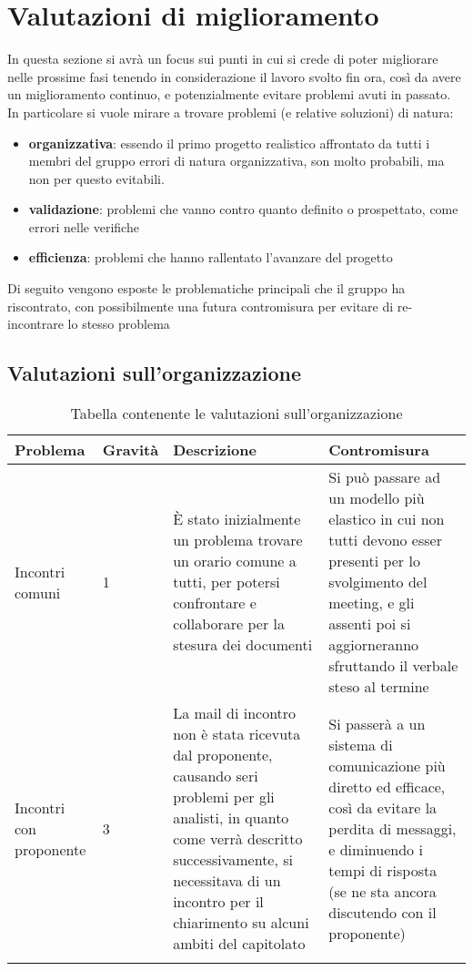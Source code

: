 \appendix
{}
\section{Valutazioni di miglioramento}
	In questa sezione si avrà un focus sui punti in cui si crede di poter migliorare nelle prossime fasi tenendo in considerazione il lavoro svolto fin ora, così da avere un miglioramento continuo, e potenzialmente evitare problemi avuti in passato.
	In particolare si vuole mirare a trovare problemi (e relative soluzioni) di natura:
	\begin{itemize}	
		\item\textbf{organizzativa}: essendo il primo progetto realistico affrontato da tutti i membri del gruppo errori di natura organizzativa, son molto probabili, ma non per questo evitabili.
		\item\textbf{validazione}: problemi che vanno contro quanto definito o prospettato, come errori nelle verifiche
		\item\textbf{efficienza}: problemi che hanno rallentato l'avanzare del progetto
	\end{itemize}
	Di seguito vengono esposte le problematiche principali che il gruppo ha riscontrato, con possibilmente una futura contromisura per evitare di re-incontrare lo stesso problema
	
	
	\subsection{Valutazioni sull'organizzazione}
		\begin{center}
			\begin{longtable}{|p{3cm}|p{1.5cm}|p{4cm}|p{4cm}|}
			\hline
			\rowcolor{lighter-grayer}
			\textbf{Problema} &  \textbf{Gravità} &  \textbf{Descrizione} & \textbf{Contromisura}\\
			\hline
			\endfirsthead
			\hline
			Incontri comuni
			&
			1
			&
			È stato inizialmente un problema trovare un orario comune a tutti, per potersi confrontare e collaborare per la stesura dei documenti
	  		&
			Si può passare ad un modello più elastico in cui non tutti devono esser presenti per lo svolgimento del meeting, e gli assenti poi si aggiorneranno sfruttando il verbale steso al termine \\
			\hline
			
			Incontri con proponente
			&
			3
			&
			La mail di incontro non è stata ricevuta dal proponente, causando seri problemi per gli analisti, in quanto come verrà descritto successivamente, si necessitava di un incontro per il chiarimento su alcuni ambiti del capitolato
	  		&
			Si passerà a un sistema di comunicazione più diretto ed efficace, così da evitare la perdita di messaggi, e diminuendo i tempi di risposta (se ne sta ancora discutendo con il proponente) \\
			\hline
			
			
			
			\rowcolor{white}
			\caption{Tabella contenente le valutazioni sull'organizzazione}
			\end{longtable}
		\end{center}

